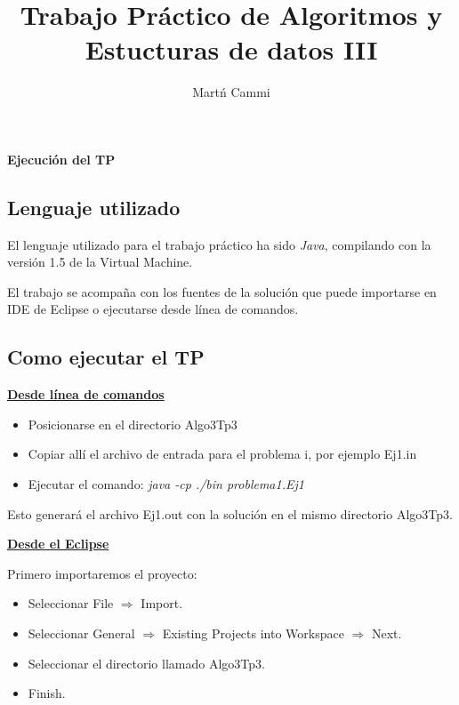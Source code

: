 \documentclass[11pt, a4paper, spanish]{article}
\author{Mart\'n Cammi}
\title{Trabajo Pr\'actico de Algoritmos y Estucturas de datos III}
\begin{document}

\maketitle

\thispagestyle{empty}

\tableofcontents

\newpage


\textbf{Ejecuci\'on del TP}
\label{sec:ejecucion}

	\subsection{Lenguaje utilizado}
		
		El lenguaje utilizado para el trabajo pr\'actico ha sido \emph{Java}, compilando con la versi\'on 1.5 de la Virtual Machine.
		
		El trabajo se acompa\~{n}a con los fuentes de la soluci\'on que puede importarse en IDE de Eclipse o ejecutarse desde l\'inea de comandos.

	\subsection{Como ejecutar el TP}
	
	\textbf{\underline{Desde l\'inea de comandos}}
	\begin{itemize}
			\item{Posicionarse en el directorio Algo3Tp3}
			\item{Copiar all\'i el archivo de entrada para el problema i, por ejemplo Ej1.in}
			\item{Ejecutar el comando: \emph{java -cp ./bin problema1.Ej1}}
	\end{itemize}
	Esto generar\'a el archivo Ej1.out con la soluci\'on en el mismo directorio Algo3Tp3.

	\textbf{\underline{Desde el Eclipse}}
	
	Primero importaremos el proyecto:	
	
	\begin{itemize}
			\item{Seleccionar File $\Rightarrow$ Import.}
			\item{Seleccionar General $\Rightarrow$ Existing Projects into Workspace $\Rightarrow$ Next.}
			\item{Seleccionar el directorio llamado Algo3Tp3.}
			\item{Finish.}
	\end{itemize}
	
\end{document}

